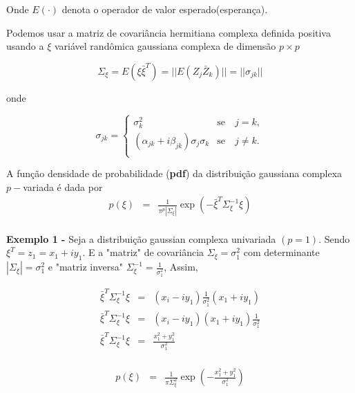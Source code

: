 \documentclass[10pt,a4paper]{article}
\begin{document}
Onde $E(\cdot)$ denota o operador de valor esperado(esperança).

Podemos usar a matriz de covariância hermitiana complexa definida positiva usando a $\xi$ variável randômica gaussiana complexa de dimensão $p\times p$

$$\Sigma_{\xi}=E(\xi\bar{\xi}^{T})=||E(Z_j\bar{Z}_k)||=||\sigma_{jk}||$$

onde

$$
\sigma_{jk} = \left\{
\begin{array}{cc}
	\sigma_k^2                                & \mbox{se}\quad j=k,  \\
	(\alpha_{jk}+i\beta_{jk})\sigma_j\sigma_k & \mbox{se}\quad j\neq k. \\
\end{array}
\right.
$$

A função densidade de probabilidade ({\bf pdf}) da distribuição gaussiana complexa $p-$variada é dada por
\begin{equation}\label{sec2eqn1}
\begin{array}{ccc}
	p(\xi)&=&\frac{1}{\pi^p|\Sigma_{\xi}|}\exp(-\bar{\xi}^{T}\Sigma_{\xi}^{-1}\xi)  \\
\end{array}
\end{equation}


{\bf Exemplo 1 -} Seja a distribuição gaussian complexa univariada $(p=1)$. Sendo $\xi^{T}=z_1=x_1+iy_1$. E a "matriz" de covariância $\Sigma_{\xi}=\sigma_{1}^{2}$ com determinante $|\Sigma_{\xi}|=\sigma_{1}^{2}$ e  "matriz inversa" $\Sigma_{\xi}^{-1}=\frac{1}{\sigma_{1}^{2}}$, Assim,

\begin{equation}\label{sec2eqn2}
\begin{array}{ccc}
	\bar{\xi}^{T}\Sigma_{\xi}^{-1}\xi&=&(x_i-iy_1)\frac{1}{\sigma_1^2}(x_1+iy_1)  \\
	\bar{\xi}^{T}\Sigma_{\xi}^{-1}\xi&=&(x_i-iy_1)(x_1+iy_1)\frac{1}{\sigma_1^2}  \\
	\bar{\xi}^{T}\Sigma_{\xi}^{-1}\xi&=&\frac{x_1^2+y_1^2}{\sigma_1^2}  \\
\end{array}
\end{equation}


\begin{equation}\label{sec2eqn3}
\begin{array}{ccc}
	p(\xi)&=&\frac{1}{\pi\Sigma_{\xi}^{2}}\exp\left(-\frac{x_1^2+y_1^2}{\sigma_1^2}\right)  \\
\end{array}
\end{equation}
\end{document}
